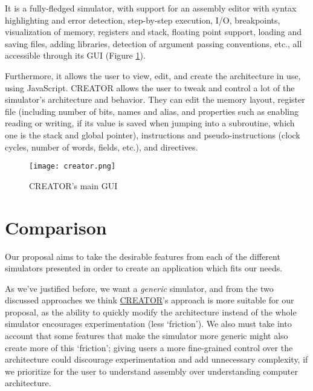 It is a fully-fledged simulator, with support for an \gls{assembly} editor with syntax highlighting and error detection, step-by-step execution, \gls{I/O}, breakpoints, visualization of \gls{memory}, \glspl{register} and \gls{stack}, floating point support, loading and saving files, adding libraries, detection of argument passing conventions, etc., all accessible through its \gls{GUI} (Figure \ref{fig:creator}). 

Furthermore, it allows the user to view, edit, and create the architecture in use, using JavaScript. CREATOR allows the user to tweak and control a lot of the simulator's architecture and behavior. They can edit the \gls{memory} layout, register file (including number of bits, names and alias, and properties such as enabling reading or writing, if its value is saved when jumping into a \gls{subroutine}, which one is the stack and global pointer), \glspl{instruction} and \glspl{pseudo-instruction} (\glspl{clock cycle}, number of words, fields, etc.), and \glspl{directive}.


\begin{figure}[h]
  \caption[CREATOR's main GUI]{CREATOR's main \gls{GUI}}
  \texttt{[image: creator.png]}
  \label{fig:creator}
\end{figure}



\section{Comparison}\label{sec:comparison}
Our proposal aims to take the desirable features from each of the different simulators presented in order to create an application which fits our needs.

As we've justified before, we want a \textit{generic} simulator, and from the two discussed approaches we think \hyperref[subsubsec:creator]{CREATOR}'s approach is more suitable for our proposal, as the ability to quickly modify the architecture instead of  the whole simulator encourages experimentation (less `friction'). We also must take into account that some features that make the simulator more generic might also create more of this `friction'; giving users a more fine-grained control over the architecture could discourage experimentation and add unnecessary complexity, if we prioritize for the user to understand \gls{assembly} over understanding computer architecture.  %


